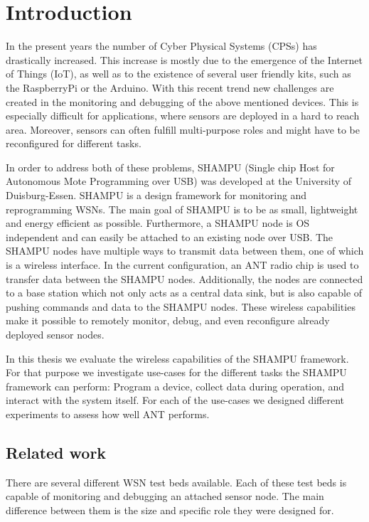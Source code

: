 \chapter{Introduction}
\label{sec:intro}
In the present years the number of Cyber Physical Systems (CPSs) has drastically increased. This increase is mostly due to the emergence of the Internet of Things (IoT), as well as to the existence of several user friendly kits, such as the RaspberryPi or the Arduino. With this recent trend new challenges are created in the monitoring and debugging of the above mentioned devices. This is especially difficult for applications, where sensors are deployed in a hard to reach area. Moreover, sensors can often fulfill multi-purpose roles and might have to be reconfigured for different tasks.

In order to address both of these problems, SHAMPU (Single chip Host for Autonomous Mote Programming over USB)\cite{smeets2014demonstration} was developed at the University of Duisburg-Essen. SHAMPU is a design framework for monitoring and reprogramming WSNs. The main goal of SHAMPU is to be as small, lightweight and energy efficient as possible. Furthermore, a SHAMPU node is OS independent and can easily be attached to an existing node over USB. The SHAMPU nodes have multiple ways to transmit data between them, one of which is a wireless interface. In the current configuration, an ANT\cite{DynastreamInnovationsInc.2013} radio chip is used to transfer data between the SHAMPU nodes. Additionally, the nodes are connected to a base station which not only acts as a central data sink, but is also capable of pushing commands and data to the SHAMPU nodes. These wireless capabilities make it possible to remotely monitor, debug, and even reconfigure already deployed sensor nodes. 

In this thesis we evaluate the wireless capabilities of the SHAMPU framework. For that purpose we investigate use-cases for the different tasks the SHAMPU framework can perform: Program a device, collect data during operation, and interact with the system itself. For each of the use-cases we designed different experiments to assess how well ANT performs.
\newpage


\section{Related work}
\label{sec:related_work}
There are several different WSN test beds available. Each of these test beds is capable of monitoring and debugging an attached sensor node. The main difference between them is the size and specific role they were designed for. 

